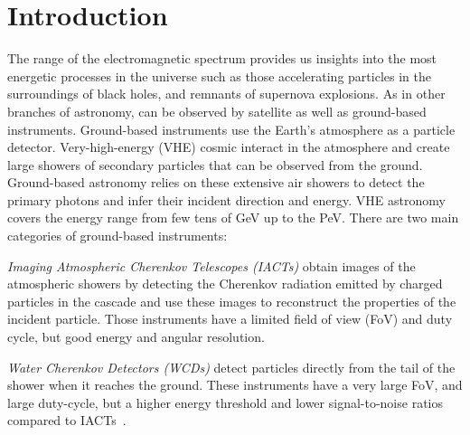 \documentclass[longauth]{aa}
\begin{document}

\maketitle

\section{Introduction}
\label{sec:introduction}


The \gammaray range of the electromagnetic spectrum provides us insights into the
most energetic processes in the universe such as those accelerating particles in the surroundings of
black holes, and remnants of supernova explosions. As in other
branches of astronomy, \gammarays can be observed by
satellite as well as ground-based instruments.
Ground-based instruments use the Earth's atmosphere as a particle detector.
Very-high-energy (VHE) cosmic \gammarays interact in the atmosphere and
create large showers of secondary particles that can be observed from the ground.
Ground-based \gammaray astronomy relies on these extensive air showers to detect the
primary \gammaray photons and infer their incident direction and energy.
VHE \gammaray astronomy covers the energy range from few tens of \si{GeV} up to the \si{PeV}.
There are two main categories of ground-based instruments: 

\textit{Imaging Atmospheric Cherenkov Telescopes (IACTs)} obtain images of the atmospheric showers
by detecting the Cherenkov radiation emitted by charged particles in the cascade and
use these images to reconstruct the properties of the incident particle.
Those instruments have a limited field of view (FoV) and duty cycle, but
good energy and angular resolution.
	
\textit{Water Cherenkov Detectors (WCDs)} detect particles directly from the tail of the
shower when it reaches the ground. These instruments have a very
large FoV, and large duty-cycle, but a higher energy threshold and
lower signal-to-noise ratios compared to IACTs~\citep{2015CRPhy..16..610D}.
\end{document}
